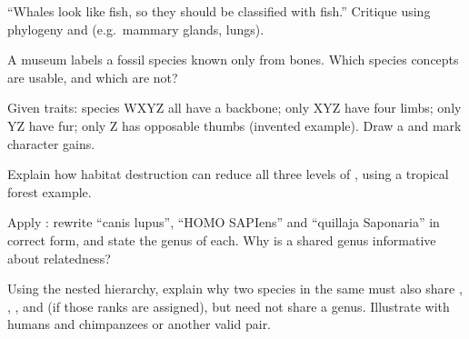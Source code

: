 \begin{exercise}[$\star\star$]\label{exo:g10:biodiversity-classification:8}
``Whales look like fish, so they should be classified with fish.''
Critique using phylogeny and  (e.g.\ mammary
glands, lungs).
\end{exercise}

\begin{exercise}[$\star\star$]\label{exo:g10:biodiversity-classification:9}
A museum labels a fossil species known only from bones. Which species
concepts are usable, and which are not?
\end{exercise}

\begin{exercise}[$\star\star\star$]\label{exo:g10:biodiversity-classification:10}
Given traits: species WXYZ all have a backbone; only XYZ have four limbs;
only YZ have fur; only Z has opposable thumbs (invented example). Draw a
 and mark character gains.
\end{exercise}

\begin{exercise}[$\star\star\star$]\label{exo:g10:biodiversity-classification:11}
Explain how habitat destruction can reduce all three levels of
, using a tropical forest example.
\end{exercise}

\begin{exercise}[$\star\star$]\label{exo:g10:biodiversity-classification:12}
Apply : rewrite ``canis lupus'', ``HOMO SAPIens'' and
``quillaja Saponaria'' in correct form, and state the genus of each.
Why is a shared genus informative about relatedness?
\end{exercise}

\begin{exercise}[$\star\star\star$]\label{exo:g10:biodiversity-classification:13}
Using the nested hierarchy, explain why two species in the same  must
also share , , ,  and  (if those ranks are
assigned), but need not share a genus. Illustrate with humans and chimpanzees
or another valid pair.
\end{exercise}

